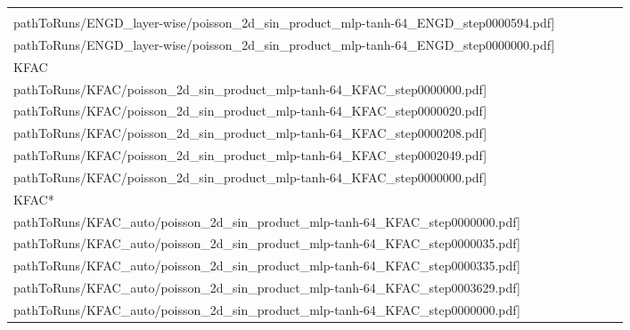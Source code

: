 \begin{table}[!h]
\begin{small}
\begin{tabularx}{\textwidth}{XXXXXX}
      &\texttt{[image: \\pathToRuns/ENGD\_layer-wise/poisson\_2d\_sin\_product\_mlp-tanh-64\_ENGD\_step0000594.pdf]}
      &\texttt{[image: \\pathToRuns/ENGD\_layer-wise/poisson\_2d\_sin\_product\_mlp-tanh-64\_ENGD\_step0000000.pdf]}
      \\
      KFAC
      &\texttt{[image: \\pathToRuns/KFAC/poisson\_2d\_sin\_product\_mlp-tanh-64\_KFAC\_step0000000.pdf]}
      &\texttt{[image: \\pathToRuns/KFAC/poisson\_2d\_sin\_product\_mlp-tanh-64\_KFAC\_step0000020.pdf]}
      &\texttt{[image: \\pathToRuns/KFAC/poisson\_2d\_sin\_product\_mlp-tanh-64\_KFAC\_step0000208.pdf]}
      &\texttt{[image: \\pathToRuns/KFAC/poisson\_2d\_sin\_product\_mlp-tanh-64\_KFAC\_step0002049.pdf]}
      &\texttt{[image: \\pathToRuns/KFAC/poisson\_2d\_sin\_product\_mlp-tanh-64\_KFAC\_step0000000.pdf]}
      \\
      KFAC*
      &\texttt{[image: \\pathToRuns/KFAC\_auto/poisson\_2d\_sin\_product\_mlp-tanh-64\_KFAC\_step0000000.pdf]}
      &\texttt{[image: \\pathToRuns/KFAC\_auto/poisson\_2d\_sin\_product\_mlp-tanh-64\_KFAC\_step0000035.pdf]}
      &\texttt{[image: \\pathToRuns/KFAC\_auto/poisson\_2d\_sin\_product\_mlp-tanh-64\_KFAC\_step0000335.pdf]}
      &\texttt{[image: \\pathToRuns/KFAC\_auto/poisson\_2d\_sin\_product\_mlp-tanh-64\_KFAC\_step0003629.pdf]}
      &\texttt{[image: \\pathToRuns/KFAC\_auto/poisson\_2d\_sin\_product\_mlp-tanh-64\_KFAC\_step0000000.pdf]}
    \end{tabularx}
  \end{small}
  \label{fig:2d-poisson-visualization}
\end{table}

